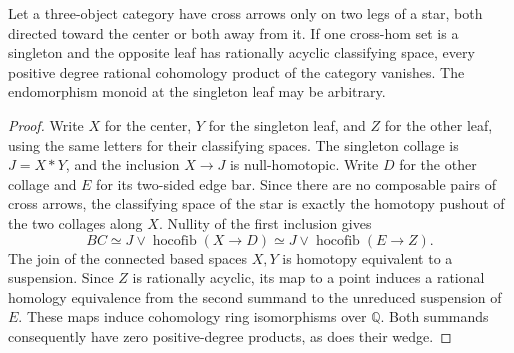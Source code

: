 \begin{lemma}
\label{C:star-singleton-join}
Let a three-object category have cross arrows only on two
legs of a star, both directed toward the center or both away
from it. If one cross-hom set is a singleton and the opposite
leaf has rationally acyclic classifying space, every positive
degree rational cohomology product of the category vanishes.
The endomorphism monoid at the singleton leaf may be arbitrary.
\end{lemma}
\begin{proof}
Write $X$ for the center, $Y$ for the singleton leaf, and $Z$
for the other leaf, using the same letters for their
classifying spaces. The singleton collage is $J=X*Y$,
and the inclusion $X\to J$ is null-homotopic. Write $D$ for
the other collage and $E$ for its two-sided edge bar. Since
there are no composable pairs of cross arrows, the classifying
space of the star is exactly the homotopy pushout of the two
collages along $X$. Nullity of the first inclusion gives
\[
 BC\simeq J\vee\operatorname{hocofib}(X\to D)
       \simeq J\vee\operatorname{hocofib}(E\to Z).
\]
The join of the connected based spaces $X,Y$ is homotopy
equivalent to a suspension. Since $Z$ is rationally acyclic,
its map to a point induces a rational homology equivalence
from the second summand to the unreduced suspension of $E$.
These maps induce cohomology ring isomorphisms over $\mathbb Q$.
Both summands consequently have zero positive-degree products,
as does their wedge.
\end{proof}

